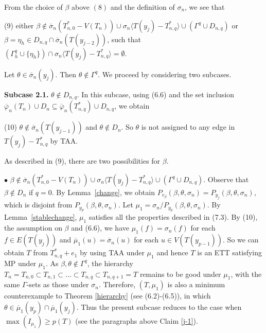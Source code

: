\documentclass[11pt]{article}
\begin{document}
From the choice of $\beta$ above $(8)$ and the definition of $\sigma_n$, we see that

(9) either $\beta \notin \overline{\sigma}_n(T_{n,0}^*-V(T_n)) \cup \sigma_n \langle T(y_j) - T_{n,q}^* \rangle \cup
(\Gamma^{q}\cup D_{n,q} )$ or $\beta=\eta_{h}\in D_{n,q}\cap \overline{\sigma}_n(T(y_{j-2}))$, such that $(\Gamma^{q}_h 
\cup \{\eta_{h}\}) \cap \sigma_n \langle T(y_j) - T_{n,q}^* \rangle=\emptyset$.  

Let $\theta \in\overline{\sigma}_n(y_j)$. Then $\theta \notin\Gamma^{q}$. We proceed by considering two subcases.


{\bf Subcase 2.1.} $\theta \notin D_{n,q}$. In this subcase, using (6.6) and the set inclusion $\overline{\varphi}_n(T_n) 
\cup D_n \subseteq  \overline{\varphi}_n(T_{n,q}^*) \cup D_{n,q}$, we obtain 

(10) $\theta \notin \overline{\sigma}_n(T(y_{j-1}))$ and $\theta \notin D_n$. So $\theta$ is not assigned to any
edge in $T(y_{j})-T_{n,q}^*$ by TAA. 

As described in (9), there are two possibilities for $\beta$.

$\bullet$ $\beta \notin \overline{\sigma}_n(T_{n,0}^*-V(T_n)) \cup \sigma_n \langle T(y_j) - T_{n,q}^* \rangle \cup
(\Gamma^{q}\cup D_{n,q} )$. Observe that $\beta\notin D_{n}$ if $q=0$. By Lemma~\ref{change}, we obtain 
$P_{v_{\beta}} (\beta, \theta, \sigma_n) = P_{y_j}(\beta, \theta, \sigma_n)$, which is disjoint from $P_{y_p}(\beta,
\theta, \sigma_n)$.  Let $\mu_1=\sigma_n/P_{y_p}(\beta, \theta, \sigma_n)$. By Lemma~\ref{stablechange},  $\mu_1$ 
satisfies all the properties described in (7.3). By (10), the assumption on $\beta$ and (6.6), we have
$\mu_1(f)=\sigma_n(f)$ for each $f\in E(T(y_j))$ and $\overline{\mu}_1(u)=\overline{\sigma}_n(u)$ for each 
$u\in V(T(y_{p-1}))$.  So we can obtain $T$ from $T_{n,q}^*+e_1$ by using TAA under $\mu_1$ and hence $T$ is an ETT satisfying MP under 
$\mu_1$. As $\beta, \theta \notin \Gamma^q$, the hierarchy $T_n=T_{n,0} \subset T_{n,1} \subset \ldots \subset 
T_{n,q} \subset T_{n,q+1}=T$ remains to be good under $\mu_1$, with the same $\Gamma$-sets as those under $\sigma_n$. 
Therefore, $(T, \mu_1)$ is also a minimum counterexample to Theorem \ref{hierarchy} (see (6.2)-(6.5)), in which 
$\theta \in \overline{\mu}_1(y_p)\cap \overline{\mu}_1(y_j)$. Thus the present subcase reduces to the case when 
$\max(I_{\mu_1}) \ge p(T)$ (see the paragraphs above Claim \ref{j-1}).
\end{document}
